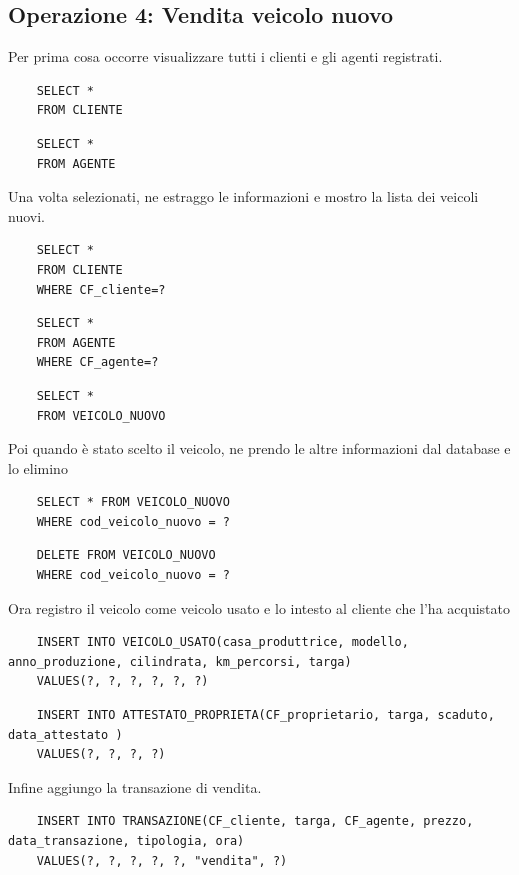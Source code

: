 \documentclass[a4paper,12pt]{report}
\begin{document}
\subsection*{Operazione 4: Vendita veicolo nuovo}
Per prima cosa occorre visualizzare tutti i clienti e gli agenti registrati.
\begin{lstlisting}
	SELECT * 
	FROM CLIENTE
\end{lstlisting}
\begin{lstlisting}
	SELECT * 
	FROM AGENTE
\end{lstlisting}
Una volta selezionati, ne estraggo le informazioni e mostro la lista dei veicoli nuovi.
\begin{lstlisting}
	SELECT * 
	FROM CLIENTE
	WHERE CF_cliente=?
\end{lstlisting}
\begin{lstlisting}
	SELECT * 
	FROM AGENTE
	WHERE CF_agente=?
\end{lstlisting}
\begin{lstlisting}
	SELECT * 
	FROM VEICOLO_NUOVO
\end{lstlisting}
Poi quando è stato scelto il veicolo, ne prendo le altre informazioni dal database e lo elimino
\begin{lstlisting}
	SELECT * FROM VEICOLO_NUOVO 
	WHERE cod_veicolo_nuovo = ?
\end{lstlisting}
\begin{lstlisting}
	DELETE FROM VEICOLO_NUOVO 
	WHERE cod_veicolo_nuovo = ?
\end{lstlisting}
Ora registro il veicolo come veicolo usato e lo intesto al cliente che l'ha acquistato
\begin{lstlisting}
	INSERT INTO VEICOLO_USATO(casa_produttrice, modello, anno_produzione, cilindrata, km_percorsi, targa) 
	VALUES(?, ?, ?, ?, ?, ?)
\end{lstlisting}
\begin{lstlisting}
	INSERT INTO ATTESTATO_PROPRIETA(CF_proprietario, targa, scaduto, data_attestato	) 
	VALUES(?, ?, ?, ?)
\end{lstlisting}
Infine aggiungo la transazione di vendita.
\begin{lstlisting}
	INSERT INTO TRANSAZIONE(CF_cliente, targa, CF_agente, prezzo, data_transazione, tipologia, ora) 
	VALUES(?, ?, ?, ?, ?, "vendita", ?)
\end{lstlisting}
\end{document}

